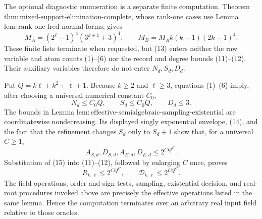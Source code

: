 The optional diagnostic enumeration is a separate finite computation.  Theorem \(\mathrm{thm{:}mixed\text{-}support\text{-}elimination\text{-}complete}\), whose rank-one cases use Lemma \(\mathrm{lem{:}rank\text{-}one\text{-}lred\text{-}normal\text{-}forms}\), gives
\[
M_A=(2^{\ell}-1)^4(3^{k+1}+3)^4,
\qquad
M_B=M_Ak(k-1)(2k-1)^4.                                   \tag{13}
\]
These finite lists terminate when requested, but (13) enters neither the raw variable and atom counts (1)--(6) nor the record and degree bounds (11)--(12).  Their auxiliary variables therefore do not enter \(N_d,S_d,D_d\).

Put \(Q=k\ell+k^2+\ell+1\).  Because \(k\ge2\) and \(\ell\ge3\), equations (1)--(6) imply, after choosing a universal numerical constant \(C_0\),
\[
N_d\le C_0Q,
\qquad S_d\le C_0Q,
\qquad D_d\le3.                                           \tag{14}
\]
The bounds in Lemma \(\mathrm{lem{:}effective\text{-}semialgebraic\text{-}sampling\text{-}existential}\) are coordinatewise nondecreasing.  Its displayed singly exponential envelope, (14), and the fact that the refinement changes \(S_d\) only to \(S_d+1\) show that, for a universal \(C\ge1\),
\[
A_{S,d},D_{S,d},A_{E,d},D_{E,d}
\le 2^{CQ^C}.                                               \tag{15}
\]
Substitution of (15) into (11)--(12), followed by enlarging \(C\) once, proves
\[
R_{k,\ell}\le2^{CQ^C},
\qquad
\mathcal D_{k,\ell}\le2^{CQ^C}.                          \tag{16}
\]
The field operations, order and sign tests, sampling, existential decision, and real-root procedures invoked above are precisely the effective operations listed in the same lemma.  Hence the computation terminates over an arbitrary real input field relative to those oracles.

